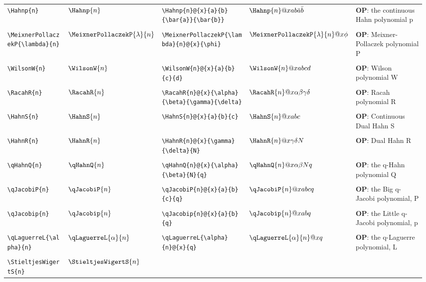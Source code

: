 \begin{supertabular}{ll|ll|p{2in}}
\verb~\Hahnp{n}~ & $\Hahnp{n}$ & 
\verb~\Hahnp{n}@{x}{a}{b}{\bar{a}}{\bar{b}}~ & $\Hahnp{n}@{x}{a}{b}{\bar{a}}{\bar{b}}$ & 
\textbf{OP}: the continuous Hahn polynomial p\\*
&&&&\\[-1ex]
\verb~\MeixnerPollaczekP{\lambda}{n}~ & $\MeixnerPollaczekP{\lambda}{n}$ & 
\verb~\MeixnerPollaczekP{\lambda}{n}@{x}{\phi}~ & $\MeixnerPollaczekP{\lambda}{n}@{x}{\phi}$ & 
\textbf{OP}: Meixner-Pollaczek polynomial P\\*
&&&&\\[-1ex]
\verb~\WilsonW{n}~ & $\WilsonW{n}$ & 
\verb~\WilsonW{n}@{x}{a}{b}{c}{d}~ & $\WilsonW{n}@{x}{a}{b}{c}{d}$ & 
\textbf{OP}: Wilson polynomial W\\*
&&&&\\[-1ex]
\verb~\RacahR{n}~ & $\RacahR{n}$ & 
\verb~\RacahR{n}@{x}{\alpha}{\beta}{\gamma}{\delta}~ & $\RacahR{n}@{x}{\alpha}{\beta}{\gamma}{\delta}$ & 
\textbf{OP}: Racah polynomial R\\*
&&&&\\[-1ex]
\verb~\HahnS{n}~ & $\HahnS{n}$ & 
\verb~\HahnS{n}@{x}{a}{b}{c}~ & $\HahnS{n}@{x}{a}{b}{c}$ & 
\textbf{OP}: Continuous Dual Hahn S\\*
&&&&\\[-1ex]
\verb~\HahnR{n}~ & $\HahnR{n}$ & 
\verb~\HahnR{n}@{x}{\gamma}{\delta}{N}~ & $\HahnR{n}@{x}{\gamma}{\delta}{N}$ & 
\textbf{OP}: Dual Hahn R\\*
&&&&\\[-1ex]
\verb~\qHahnQ{n}~ & $\qHahnQ{n}$ & 
\verb~\qHahnQ{n}@{x}{\alpha}{\beta}{N}{q}~ & $\qHahnQ{n}@{x}{\alpha}{\beta}{N}{q}$ & 
\textbf{OP}: the q-Hahn polynomial Q\\*
&&&&\\[-1ex]
\verb~\qJacobiP{n}~ & $\qJacobiP{n}$ & 
\verb~\qJacobiP{n}@{x}{a}{b}{c}{q}~ & $\qJacobiP{n}@{x}{a}{b}{c}{q}$ & 
\textbf{OP}: the Big q-Jacobi polynomial, P\\*
&&&&\\[-1ex]
\verb~\qJacobip{n}~ & $\qJacobip{n}$ & 
\verb~\qJacobip{n}@{x}{a}{b}{q}~ & $\qJacobip{n}@{x}{a}{b}{q}$ & 
\textbf{OP}: the Little q-Jacobi polynomial, p\\*
&&&&\\[-1ex]
\verb~\qLaguerreL{\alpha}{n}~ & $\qLaguerreL{\alpha}{n}$ & 
\verb~\qLaguerreL{\alpha}{n}@{x}{q}~ & $\qLaguerreL{\alpha}{n}@{x}{q}$ & 
\textbf{OP}: the q-Laguerre polynomial, L\\*
&&&&\\[-1ex]
\verb~\StieltjesWigertS{n}~ & $\StieltjesWigertS{n}$ & 

\end{supertabular}
